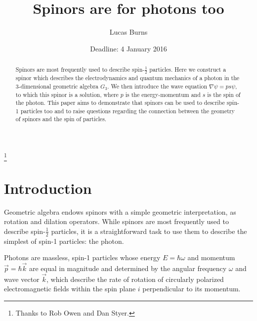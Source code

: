 \documentclass{birkjour}
\begin{document}
\title{Spinors are for photons too}

\author{Lucas Burns} 
\address{
135 W Lorain St\\
OCMR 488\\
Oberlin, OH 44074 \\
USA}

\thanks{Thanks to Rob Owen and Dan Styer.}



\date{Deadline: 4 January 2016}

\begin{abstract}
  Spinors are most frequently used to describe spin-$\frac{1}{2}$ particles. Here we construct a spinor which describes the electrodynamics and quantum mechanics of a photon in the 3-dimensional geometric algebra $G_3$. We then introduce the wave equation $\nabla \psi = p s \psi$, to which this spinor is a solution, where $p$ is the energy-momentum and $s$ is the spin of the photon. This paper aims to demonstrate that spinors can be used to describe spin-1 particles too and to raise questions regarding the connection between the geometry of spinors and the spin of particles.
\end{abstract}

\maketitle

\section{Introduction}

Geometric algebra endows spinors with a simple geometric interpretation, as rotation and dilation operators. While spinors are most frequently used to describe spin-$\frac{1}{2}$ particles, it is a straightforward task to use them to describe the simplest of spin-1 particles: the photon.

Photons are massless, spin-1 particles whose energy $E = \hbar \omega$ and momentum $\vec p = \hbar \vec k$ are equal in magnitude and determined by the angular frequency $\omega$ and wave vector $\vec k$, which describe the rate of rotation of circularly polarized electromagnetic fields within the spin plane $i$ perpendicular to its momentum.
\end{document}
